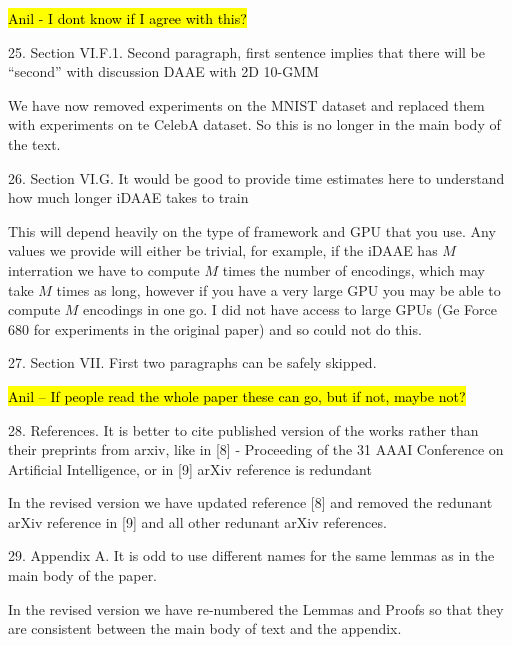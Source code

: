 \documentclass{article}
\begin{document}
\hl{Anil - I dont know if I agree with this?\\}


{\color{blue}
25. Section VI.F.1. Second paragraph, first sentence implies that there will be ``second'' with discussion DAAE with 2D 10-GMM\\
}

{\color{red} We have now removed experiments on the MNIST dataset and replaced them with experiments on te CelebA dataset. So this is no longer in the main body of the text.\\}

{\color{blue}
26. Section VI.G. It would be good to provide time estimates here to understand how much longer iDAAE takes to train\\
}

{\color{red} This will depend heavily on the type of framework and GPU that you use. Any values we provide will either be trivial, for example, if the iDAAE has $M$ interration we have to compute $M$ times the number of encodings, which may take $M$ times as long, however if you have a very large GPU you may be able to compute $M$ encodings in one go. I did not have access to large GPUs (Ge Force 680 for experiments in the original paper) and so could not do this.\\}

{\color{blue}
27. Section VII. First two paragraphs can be safely skipped.\\
}

\hl{Anil -- If people read the whole paper these can go, but if not, maybe not?\\}

{\color{blue}
28. References. It is better to cite published version of the works rather than their preprints from arxiv, like in [8] - Proceeding of the 31 AAAI Conference on Artificial Intelligence, or in [9] arXiv reference is redundant\\
}

{\color{red} In the revised version we have updated reference [8] and removed the redunant arXiv reference in [9] and all other redunant arXiv references.\\}

{\color{blue}
29. Appendix A. It is odd to use different names for the same lemmas as in the main body of the paper.\\
}

{\color{red} In the revised version we have re-numbered the Lemmas and Proofs so that they are consistent between the main body of text and the appendix.\\}
\end{document}
